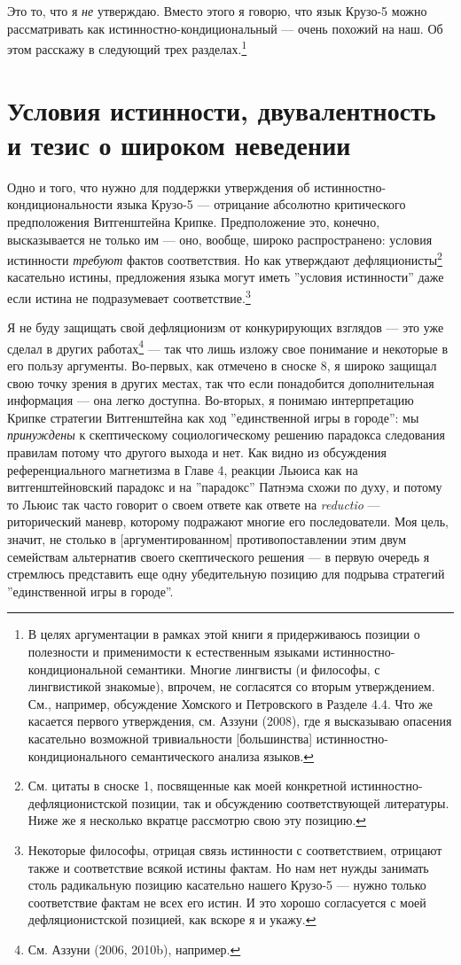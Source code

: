 \documentclass[11pt]{book}
\begin{document}
Это то, что я \textit{не} утверждаю. Вместо этого я говорю, что язык Крузо-5 можно рассматривать как истинностно-кондициональный --- очень похожий на наш. Об этом расскажу в следующий трех разделах.\footnote{В целях аргументации в рамках этой книги я придерживаюсь позиции о полезности и применимости к естественным языками истинностно-кондициональной семантики. Многие лингвисты (и философы, с лингвистикой знакомые), впрочем, не согласятся со вторым утверждением. См., например, обсуждение Хомского и Петровского в Разделе 4.4. Что же касается первого утверждения, см. Аззуни (2008), где я высказываю опасения касательно возможной тривиальности [большинства] истинностно-кондиционального семантического анализа языков.}

\section{Условия истинности, двувалентность и тезис о широком неведении}

Одно и того, что нужно для поддержки утверждения об истинностно-кондициональности языка Крузо-5 --- отрицание абсолютно критического предположения Витгенштейна Крипке. Предположение это, конечно, высказывается не только им --- оно, вообще, широко распространено: условия истинности \textit{требуют} фактов соответствия. Но как утверждают дефляционисты\footnote{См. цитаты в сноске 1, посвященные как моей конкретной истинностно-дефляционистской позиции, так и обсуждению соответствующей литературы. Ниже же я несколько вкратце рассмотрю свою эту позицию.} касательно истины, предложения языка могут иметь ''условия истинности'' даже если истина не подразумевает соответствие.\footnote{Некоторые философы, отрицая связь истинности с соответствием, отрицают также и соответствие всякой истины фактам. Но нам нет нужды занимать столь радикальную позицию касательно нашего Крузо-5 --- нужно только соответствие фактам не всех его истин. И это хорошо согласуется с моей дефляционистской позицией, как вскоре я и укажу.}

Я не буду защищать свой дефляционизм от конкурирующих взглядов --- это уже сделал в других работах\footnote{См. Аззуни (2006, 2010b), например.} --- так что лишь изложу свое понимание и некоторые в его пользу аргументы. Во-первых, как отмечено в сноске 8, я широко защищал свою точку зрения в других местах, так что если понадобится дополнительная информация --- она легко доступна. Во-вторых, я понимаю интерпретацию Крипке стратегии Витгенштейна как ход ''единственной игры в городе'': мы \textit{принуждены} к скептическому социологическому решению парадокса следования правилам потому что другого выхода и нет. Как видно из обсуждения референциального магнетизма в Главе 4, реакции Льюиса как на витгенштейновский парадокс и на ''парадокс'' Патнэма схожи по духу, и потому то Льюис так часто говорит о своем ответе как ответе на \textit{reductio} --- риторический маневр, которому подражают многие его последователи. Моя цель, значит, не столько в [аргументированном] противопоставлении этим двум семействам альтернатив своего скептического решения --- в первую очередь я стремлюсь представить еще одну убедительную позицию для подрыва стратегий ''единственной игры в городе''.
\end{document}
